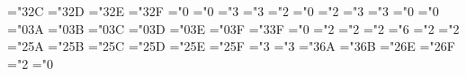 { \mathchardef\hmLeftrightarrow="3\mthsy@@2C
 \mathchardef\hmnwarrow="3\mthsy@@2D
 \mathchardef\hmswarrow="3\mthsy@@2E
 \mathchardef\hmpropto="3\mthsy@@2F
 \mathchardef\hmprime="0
 \mathchardef\hminfty="0
 \mathchardef\hmin="3
 \mathchardef\hmni="3 \let\hmowns=\hmni
 \mathchardef\hmbigtriangleup="2
 \mathchardef\hmtriangle="0
 \mathchardef\hmbigtriangledown="2
 \mathchardef\hmnot="3
 \mathchardef\hmmapstochar="3 
 \mathchardef\hmforall="0
 \mathchardef\hmexists="0
 \mathchardef\hmneg="0\mthsy@@3A \let\lnot=\neg
 \mathchardef\hmemptyset="0\mthsy@@3B
 \mathchardef\hmRe="0\mthsy@@3C
 \mathchardef\hmIm="0\mthsy@@3D
 \mathchardef\hmtop="0\mthsy@@3E
 \mathchardef\hmbot="0\mthsy@@3F
 \mathchardef\hmperp="3\mthsy@@3F
 \mathchardef\hmaleph="0
 \mathchardef\hmcomp="2
 \def\hmvec{\mathaccent"0\mthsy@@45 }%
 \mathchardef\hmtriangleright="2
 \mathchardef\hmtriangleleft="2
 \mathchardef\hmcolon="6
 \mathchardef\hmsetdif="2
 \mathchardef\hmcupprod="2
 \mathchardef\hmcapprod="2\mthsy@@5A
 \mathchardef\hmcup="2\mthsy@@5B
 \mathchardef\hmcap="2\mthsy@@5C
 \mathchardef\hmuplus="2\mthsy@@5D
 \mathchardef\hmwedge="2\mthsy@@5E \let\hmland=\hmwedge
 \mathchardef\hmvee="2\mthsy@@5F \let\hmlor=\hmvee
 \mathchardef\hmvdash="3
 \mathchardef\hmdashv="3
 \def\hmlfloor{\delimiter"4\mthsy@@62\mthex@@04 }%
 \def\hmrfloor{\delimiter"5\mthsy@@63\mthex@@05 }%
 \def\hmlceil{\delimiter"4\mthsy@@64\mthex@@06 }%
 \def\hmrceil{\delimiter"5\mthsy@@65\mthex@@07 }%
 \def\hmlbrace{\delimiter"4\mthsy@@66\mthex@@08 }%
 \def\hmrbrace{\delimiter"5\mthsy@@67\mthex@@09 }%
 \def\hmlangle{\delimiter"4\mthsy@@68\mthex@@0A }%
 \def\hmrangle{\delimiter"5\mthsy@@69\mthex@@0B }%
 \mathchardef\hmmid="3\mthsy@@6A
 \def\hmvert{\delimiter"\mthsy@@6A\mthex@@0C }%
 \mathchardef\hmparallel="3\mthsy@@6B
 \def\hmVert{\delimiter"\mthsy@@6B\mthex@@0D }%
 \def\hmupdownarrow{\delimiter"3\mthsy@@6C\mthex@@3F }%
 \def\hmUpdownarrow{\delimiter"3\mthsy@@6D\mthex@@77 }%
 \def\hmbackslash{\delimiter"\mthsy@@6E\mthex@@0F }%
 \def\hmarrowvert{\delimiter"\mthsy@@6A\mthex@@3C }%
 \def\hmArrowvert{\delimiter"\mthsy@@6\mthex@@3D }%
 \def\hmlgroup{\delimiter"4\mthsy@@2E\mthex@@3A }%
 \def\hmrgroup{\delimiter"5\mthsy@@2F\mthex@@3B }%
 \def\hmbracevert{\delimiter"\mthex@@8D\mthex@@8D }%
 \mathchardef\hmsetminus="2\mthsy@@6E 
 \mathchardef\hmwr="2\mthsy@@6F
 \def\hmsurd{{\mathchar"1\mthsy@@70}}%
 \mathchardef\hmamalg="2
 \mathchardef\hmnabla="0
}
